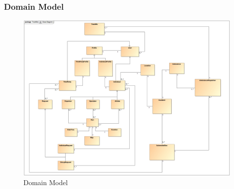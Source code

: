\documentclass[a4paper]{article}
\begin{document}
    \subsubsection{Domain Model}
    \begin{figure}[!ht]
        \centering
        \includegraphics[width=\textwidth]{images/UML/ClassDiagram.jpg}
        \caption{Domain Model}
    \end{figure}
    
    \newpage
    
\end{document}
